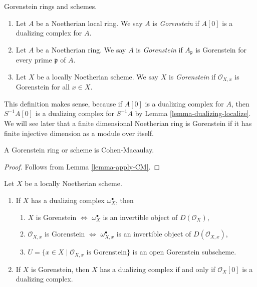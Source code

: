 \begin{definition}
\label{definition-gorenstein}
Gorenstein rings and schemes.
\begin{enumerate}
\item Let $A$ be a Noetherian local ring. We say $A$ is {\it Gorenstein}
if $A[0]$ is a dualizing complex for $A$.
\item Let $A$ be a Noetherian ring. We say $A$ is {\it Gorenstein}
if $A_\mathfrak p$ is Gorenstein for every prime $\mathfrak p$ of $A$.
\item Let $X$ be a locally Noetherian scheme. We say $X$ is {\it Gorenstein}
if $\mathcal{O}_{X, x}$ is Gorenstein for all $x \in X$.
\end{enumerate}
\end{definition}

\noindent
This definition makes sense, because if $A[0]$ is a dualizing complex
for $A$, then $S^{-1}A[0]$ is a dualizing complex for $S^{-1}A$ by
Lemma \ref{lemma-dualizing-localize}.
We will see later that a finite dimensional Noetherian ring is Gorenstein
if it has finite injective dimension as a module over itself.

\begin{lemma}
\label{lemma-gorenstein-CM}
A Gorenstein ring or scheme is Cohen-Macaulay.
\end{lemma}

\begin{proof}
Follows from Lemma \ref{lemma-apply-CM}.
\end{proof}

\begin{lemma}
\label{lemma-gorenstein}
Let $X$ be a locally Noetherian scheme.
\begin{enumerate}
\item If $X$ has a dualizing complex $\omega_X^\bullet$, then
\begin{enumerate}
\item $X$ is Gorenstein $\Leftrightarrow$ $\omega_X^\bullet$ is an invertible
object of $D(\mathcal{O}_X)$,
\item $\mathcal{O}_{X, x}$ is Gorenstein $\Leftrightarrow$
$\omega_{X, x}^\bullet$ is an invertible object of $D(\mathcal{O}_{X, x})$,
\item $U = \{x \in X \mid \mathcal{O}_{X, x}\text{ is Gorenstein}\}$
is an open Gorenstein subscheme.
\end{enumerate}
\item If $X$ is Gorenstein, then $X$ has a dualizing complex if and
only if $\mathcal{O}_X[0]$ is a dualizing complex.
\end{enumerate}
\end{lemma}

